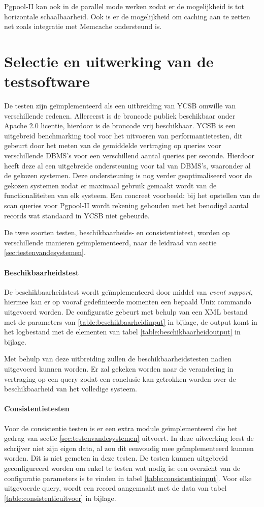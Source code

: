 Pgpool-II kan ook in de parallel mode werken zodat er de mogelijkheid is tot horizontale schaalbaarheid. Ook is er de mogelijkheid om caching aan te zetten net zoals integratie met Memcache ondersteund is. 

\section{Selectie en uitwerking van de testsoftware}
De testen zijn geïmplementeerd als een uitbreiding van YCSB\cite{cooper2010benchmarking} omwille van verschillende redenen. Allereerst is de broncode publiek beschikbaar onder Apache 2.0 licentie, hierdoor is de broncode vrij beschikbaar. YCSB is een uitgebreid benchmarking tool voor het uitvoeren van performantietesten, dit gebeurt door het meten van de gemiddelde vertraging op queries voor verschillende DBMS's voor een verschillend aantal queries per seconde. Hierdoor heeft deze al een uitgebreide ondersteuning voor tal van DBMS's, waaronder al de gekozen systemen. Deze ondersteuning is nog verder geoptimaliseerd voor de gekozen systemen zodat er maximaal gebruik gemaakt wordt van de functionaliteiten van elk systeem. Een concreet voorbeeld: bij het opstellen van de scan queries voor Pgpool-II wordt rekening gehouden met het benodigd aantal records wat standaard in YCSB niet gebeurde. 

De twee soorten testen, beschikbaarheids- en consistentietest, worden op verschillende manieren geïmplementeerd, naar de leidraad van sectie \ref{sec:testenvandesystemen}.  

\paragraph{Beschikbaarheidstest} De beschikbaarheidstest wordt geïmplementeerd door middel van \textit{event support}, hiermee kan er op vooraf gedefinieerde momenten een bepaald Unix commando uitgevoerd worden. De configuratie gebeurt met behulp van een XML bestand met de parameters van \ref{table:beschikbaarheidinput} in bijlage, de output komt in het logbestand met de elementen van tabel \ref{table:beschikbaarheidoutput} in bijlage. 

Met behulp van deze uitbreiding zullen de beschikbaarheidstesten nadien uitgevoerd kunnen worden. Er zal gekeken worden naar de verandering in vertraging op een query zodat een conclusie kan getrokken worden over de beschikbaarheid van het volledige systeem. 

\paragraph{Consistentietesten} Voor de consistentie testen is er een extra module geïmplementeerd die het gedrag van sectie \ref{sec:testenvandesystemen} uitvoert. In deze uitwerking leest de schrijver niet zijn eigen data, al zou dit eenvoudig mee geïmplementeerd kunnen worden. Dit is niet gemeten in deze testen. De testen kunnen uitgebreid geconfigureerd worden om enkel te testen wat nodig is: een overzicht van de configuratie parameters is te vinden in tabel \ref{table:consistentieinput}. Voor elke uitgevoerde query, wordt een record aangemaakt met de data van tabel \ref{table:consistentieuitvoer} in bijlage. 

